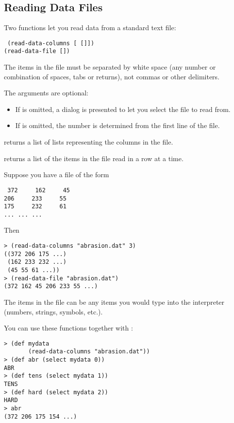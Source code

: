 \begin{slide}{}
\subsection{Reading Data Files}
Two functions let you read data from a standard text file:
{\Large
\begin{flushleft}\tt
(read-data-columns [ []])\\
(read-data-file [])
\end{flushleft}}
The items in the file must be separated by white space (any number or
combination of spaces, tabs or returns), not commas or other
delimiters.

The arguments are optional:
\begin{itemize}
\item
If  is omitted, a dialog is presented to let you
select the file to read from.
\item
If  is omitted, the number is determined from the first
line of the file.
\end{itemize}
 returns a list of lists representing the
columns in the file.

 returns a list of the items in the file read
in a row at a time.
\end{slide}

\begin{slide}{}
Suppose you have a file  of the form
\begin{flushleft}\tt
372~~~~~162~~~~~45\\
206~~~~~233~~~~~55\\
175~~~~~232~~~~~61\\
...     ...     ...
\end{flushleft}
Then
\begin{verbatim}
> (read-data-columns "abrasion.dat" 3)
((372 206 175 ...)
 (162 233 232 ...)
 (45 55 61 ...))
> (read-data-file "abrasion.dat")
(372 162 45 206 233 55 ...)
\end{verbatim}
The items in the file can be any items you would type into the
interpreter (numbers, strings, symbols, etc.).
\end{slide}

\begin{slide}{}
You can use these functions together with :
{\Large
\begin{verbatim}
> (def mydata
       (read-data-columns "abrasion.dat"))
> (def abr (select mydata 0))
ABR
> (def tens (select mydata 1))
TENS
> (def hard (select mydata 2))
HARD
> abr
(372 206 175 154 ...)
\end{verbatim}}
\end{slide}

